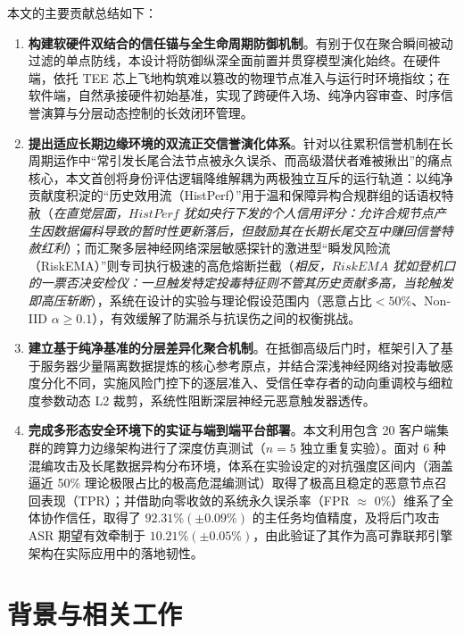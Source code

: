\documentclass[11pt, a4paper, UTF8, fontset=fandol]{ctexart}
\begin{document}
本文的主要贡献总结如下：
\begin{enumerate}
    \item \textbf{构建软硬件双结合的信任锚与全生命周期防御机制}。有别于仅在聚合瞬间被动过滤的单点防线，本设计将防御纵深全面前置并贯穿模型演化始终。在硬件端，依托 TEE 芯上飞地构筑难以篡改的物理节点准入与运行时环境指纹；在软件端，自然承接硬件初始基准，实现了跨硬件入场、纯净内容审查、时序信誉演算与分层动态控制的长效闭环管理。
    \item \textbf{提出适应长期边缘环境的双流正交信誉演化体系}。针对以往累积信誉机制在长周期运作中“常引发长尾合法节点被永久误杀、而高级潜伏者难被揪出”的痛点核心，本文首创将身份评估逻辑降维解耦为两极独立互斥的运行轨道：以纯净贡献度积淀的“历史效用流（HistPerf）”用于温和保障异构合规群组的话语权特赦（\textit{在直觉层面，$HistPerf$ 犹如央行下发的个人信用评分：允许合规节点产生因数据偏科导致的暂时性更新落后，但鼓励其在长期长尾交互中赚回信誉特赦红利}）；而汇聚多层神经网络深层敏感探针的激进型“瞬发风险流（RiskEMA）”则专司执行极速的高危熔断拦截（\textit{相反，$RiskEMA$ 犹如登机口的一票否决安检仪：一旦触发特定投毒特征则不管其历史贡献多高，当轮触发即高压斩断}），系统在设计的实验与理论假设范围内（恶意占比$<50\%$、Non-IID $\alpha \geq 0.1$），有效缓解了防漏杀与抗误伤之间的权衡挑战。
    \item \textbf{建立基于纯净基准的分层差异化聚合机制}。在抵御高级后门时，框架引入了基于服务器少量隔离数据提炼的核心参考原点，并结合深浅神经网络对投毒敏感度分化不同，实施风险门控下的逐层准入、受信任幸存者的动向重调校与细粒度参数动态 L2 裁剪，系统性阻断深层神经元恶意触发器透传。
    \item \textbf{完成多形态安全环境下的实证与端到端平台部署}。本文利用包含 20 客户端集群的跨算力边缘架构进行了深度仿真测试（$n=5$ 独立重复实验）。面对 6 种混编攻击及长尾数据异构分布环境，体系在实验设定的对抗强度区间内（涵盖逼近 50\% 理论极限占比的极高危混编测试）取得了极高且稳定的恶意节点召回表现（TPR）；并借助向零收敛的系统永久误杀率（FPR $\approx$ 0\%）维系了全体协作信任，取得了 $92.31\% (\pm 0.09\%)$ 的主任务均值精度，及将后门攻击 ASR 期望有效牵制于 $10.21\% (\pm 0.05\%)$，由此验证了其作为高可靠联邦引擎架构在实际应用中的落地韧性。
\end{enumerate}


\section{背景与相关工作}
\end{document}
